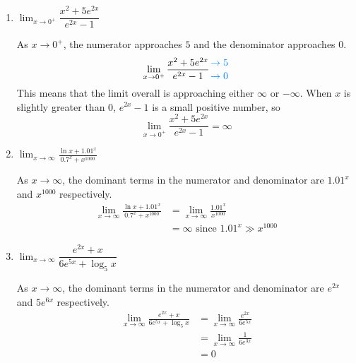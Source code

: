 \documentclass{article}
\begin{document}
\begin{enumerate}[resume]
\begin{enumerate}
  \item


    \begin{problem}[\vfill]
      $\displaystyle \lim_{x \to 0^+} \dfrac{x^2 + 5 e^{2x}}{e^{2x} - 1}$
    \end{problem}

    \begin{solution}
      As $x\to 0^+$, the numerator approaches $5$ and the denominator
      approaches $0$.
      \[\lim_{x \to 0^+} \frac{x^2 + 5e^{2x}}{e^{2x}-1} \genfrac{}{}{0pt}{}{\color{skyblue} \to 5}{\color{skyblue} \to 0}\]
      This means that the limit overall is approaching either $\infty$
      or $-\infty$. When $x$ is slightly greater than $0$,
      $e^{2x}-1$ is a small positive number,
      so
      \[\lim_{x \to 0^+} \frac{x^2 + 5e^{2x}}{e^{2x}-1}=\infty\]
    \end{solution}

  \item
    \begin{problem}[\vfill]
      $\displaystyle \lim_{x \to \infty} \frac{\ln x + 1.01^x}{0.7^x + x^{1000}}$ 
    \end{problem}

     \begin{solution}
      As $x\to \infty$, the dominant terms in the numerator and denominator
      are $1.01^x$ and $x^{1000}$ respectively.
      \begin{align*}
        \lim_{x \to \infty} \frac{\ln x + 1.01^x}{0.7^x + x^{1000}} 
        &= \lim_{x \to \infty} \frac{1.01^x}{x^{1000}} \\
        &= \infty \text{ since $1.01^x \gg x^{1000}$}
      \end{align*}
    \end{solution}

  \item
    \begin{problem}[\vfill\newpage]
      $\displaystyle \lim_{x \to \infty} \dfrac{e^{2x} + x}{6e^{5x} + \log_5 x}$
    \end{problem}

    \begin{solution}
      As $x\to \infty$, the dominant terms in the numerator and denominator
      are $e^{2x}$ and $5e^{6x}$ respectively.
      \begin{align*}
        \lim_{x \to \infty} \frac{e^{2x} + x}{6e^{5x} + \log_5 x}  
        &= \lim_{x \to \infty} \frac{e^{2x}}{6e^{5x}} \\
        &= \lim_{x \to \infty} \frac{1}{6e^{3x}} \\
        &= 0
      \end{align*}
    \end{solution}


\end{enumerate}
\end{enumerate}
\end{document}
